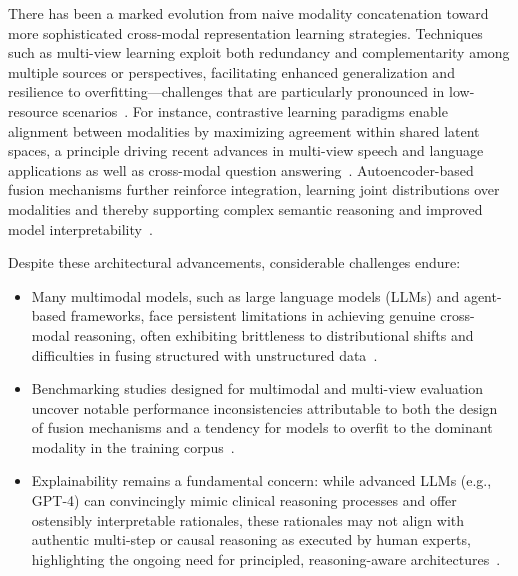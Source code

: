 \documentclass[sigconf]{acmart}
\begin{document}
There has been a marked evolution from naive modality concatenation toward more sophisticated cross-modal representation learning strategies. Techniques such as multi-view learning exploit both redundancy and complementarity among multiple sources or perspectives, facilitating enhanced generalization and resilience to overfitting—challenges that are particularly pronounced in low-resource scenarios~\cite{ref79}. For instance, contrastive learning paradigms enable alignment between modalities by maximizing agreement within shared latent spaces, a principle driving recent advances in multi-view speech and language applications as well as cross-modal question answering~\cite{ref31,ref79}. Autoencoder-based fusion mechanisms further reinforce integration, learning joint distributions over modalities and thereby supporting complex semantic reasoning and improved model interpretability~\cite{ref79,ref46,ref47}. 

Despite these architectural advancements, considerable challenges endure:
\begin{itemize}
    \item Many multimodal models, such as large language models (LLMs) and agent-based frameworks, face persistent limitations in achieving genuine cross-modal reasoning, often exhibiting brittleness to distributional shifts and difficulties in fusing structured with unstructured data~\cite{ref36,ref46,ref49,ref60,ref74,ref90}.
    \item Benchmarking studies designed for multimodal and multi-view evaluation uncover notable performance inconsistencies attributable to both the design of fusion mechanisms and a tendency for models to overfit to the dominant modality in the training corpus~\cite{ref31,ref74,ref80,ref87,ref88}.
    \item Explainability remains a fundamental concern: while advanced LLMs (e.g., GPT-4) can convincingly mimic clinical reasoning processes and offer ostensibly interpretable rationales, these rationales may not align with authentic multi-step or causal reasoning as executed by human experts, highlighting the ongoing need for principled, reasoning-aware architectures~\cite{ref31,ref36,ref49,ref55,ref89}.
\end{itemize}
\end{document}
